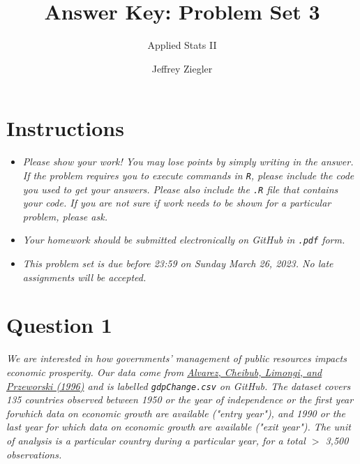 \documentclass[12pt,letterpaper]{article}
\title{Answer Key: Problem Set 3}
\date{Jeffrey Ziegler}
\author{Applied Stats II}
\begin{document}
	\maketitle
	
	\section*{Instructions}
	\begin{itemize}
		\item \textit{Please show your work! You may lose points by simply writing in the answer. If the problem requires you to execute commands in \texttt{R}, please include the code you used to get your answers. Please also include the \texttt{.R} file that contains your code. If you are not sure if work needs to be shown for a particular problem, please ask.}
			\item \textit{Your homework should be submitted electronically on GitHub in \texttt{.pdf} form.}
			\item \textit{This problem set is due before 23:59 on Sunday March 26, 2023. No late assignments will be accepted.}

	\end{itemize}
	\vspace{.25cm}
	
	\section*{Question 1}
	\vspace{.25cm}
\noindent \emph{We are interested in how governments' management of public resources impacts economic prosperity. Our data come from \href{https://www.researchgate.net/profile/Adam_Przeworski/publication/240357392_Classifying_Political_Regimes/links/0deec532194849aefa000000/Classifying-Political-Regimes.pdf}{Alvarez, Cheibub, Limongi, and Przeworski (1996)} and is labelled \texttt{gdpChange.csv} on GitHub. The dataset covers 135 countries observed between 1950 or the year of independence or the first year forwhich data on economic growth are available ("entry year"), and 1990 or the last year for which data on economic growth are available ("exit year"). The unit of analysis is a particular country during a particular year, for a total $>$ 3,500 observations. }
\end{document}
